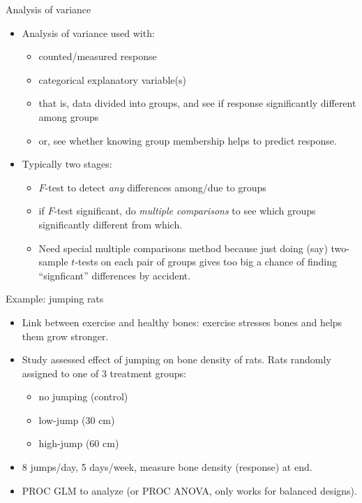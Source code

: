 \documentclass[pdf]{prosper}
\begin{document}
\begin{slide}{Analysis of variance}

  \begin{itemize}
  \item Analysis of variance used with:
    \begin{itemize}
    \item counted/measured response
    \item categorical explanatory variable(s)
    \item that is, data divided into groups, and see if response significantly different among groups
    \item or, see whether knowing group membership helps to predict response.
    \end{itemize}
  \item Typically two stages:
    \begin{itemize}
    \item $F$-test to detect {\em any} differences among/due to groups
    \item if $F$-test significant, do {\em multiple comparisons} to see which groups significantly different from which.
    \item Need special multiple comparisons method because just doing (say) two-sample $t$-tests on each pair of groups gives too big a chance of finding ``signficant'' differences by accident.
    \end{itemize}
  \end{itemize}
  
\end{slide}

\begin{slide}{Example: jumping rats}

  \begin{itemize}
  \item Link between exercise and healthy bones: exercise stresses bones and helps them grow stronger.
  \item Study assessed effect of jumping on bone density of rats. Rats randomly assigned to one of 3 treatment groups:
    \begin{itemize}
    \item no jumping (control)
    \item low-jump (30 cm)
    \item high-jump (60 cm)
    \end{itemize}
  \item 8 jumps/day, 5 days/week, measure bone density (response) at end.
  \item PROC GLM to analyze (or PROC ANOVA, only works for balanced designs).
  \end{itemize}
  
\end{slide}
\end{document}

